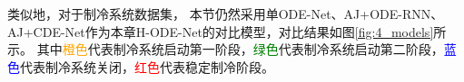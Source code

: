 类似地，对于制冷系统数据集，
本节仍然采用单ODE-Net、AJ+ODE-RNN、AJ+CDE-Net作为本章H-ODE-Net的对比模型，对比结果如图\ref{fig:4_models}所示。
其中\textcolor{orange}{橙色}代表制冷系统启动第一阶段，\textcolor{green}{绿色}代表制冷系统启动第二阶段，\textcolor{blue}{蓝色}代表制冷系统关闭，\textcolor{red}{红色}代表稳定制冷阶段。
\begin{figure}
    \centering
    \hspace{-0.2in}
    \hspace{-0.08in}
    \hspace{-0.08in}
    \hspace{-0.08in}

\end{figure}
